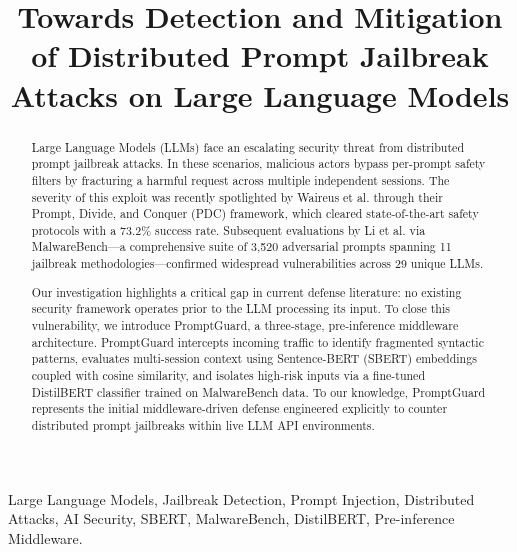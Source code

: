 \documentclass[conference]{IEEEtran}
\begin{document}
\title{Towards Detection and Mitigation of Distributed Prompt Jailbreak Attacks on Large Language Models}

\author{
    \renewcommand{\and}{\unskip\color{gray}{\scriptsize and}\ }
}

\maketitle

\begin{abstract}
Large Language Models (LLMs) face an escalating security threat from distributed prompt jailbreak attacks. In these scenarios, malicious actors bypass per-prompt safety filters by fracturing a harmful request across multiple independent sessions. The severity of this exploit was recently spotlighted by Waireus et al. through their Prompt, Divide, and Conquer (PDC) framework, which cleared state-of-the-art safety protocols with a \(73.2\%\) success rate. Subsequent evaluations by Li et al. via MalwareBench—a comprehensive suite of 3,520 adversarial prompts spanning 11 jailbreak methodologies—confirmed widespread vulnerabilities across 29 unique LLMs.

Our investigation highlights a critical gap in current defense literature: no existing security framework operates prior to the LLM processing its input. To close this vulnerability, we introduce PromptGuard, a three-stage, pre-inference middleware architecture. PromptGuard intercepts incoming traffic to identify fragmented syntactic patterns, evaluates multi-session context using Sentence-BERT (SBERT) embeddings coupled with cosine similarity, and isolates high-risk inputs via a fine-tuned DistilBERT classifier trained on MalwareBench data. To our knowledge, PromptGuard represents the initial middleware-driven defense engineered explicitly to counter distributed prompt jailbreaks within live LLM API environments.
\end{abstract}

\begin{IEEEkeywords}
Large Language Models, Jailbreak Detection, Prompt Injection, Distributed Attacks, AI Security, SBERT, MalwareBench, DistilBERT, Pre-inference Middleware.
\end{IEEEkeywords}
\end{document}
